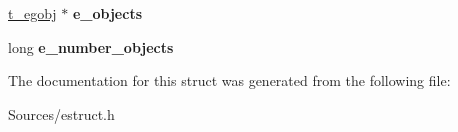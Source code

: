 \begin{DoxyCompactItemize}
\item 
\hypertarget{struct__elayer_a6f0b120b9e9be17af36ba96a368ffccb}{\hyperlink{struct__egobj}{t\-\_\-egobj} $\ast$ {\bfseries e\-\_\-objects}}\label{struct__elayer_a6f0b120b9e9be17af36ba96a368ffccb}

\item 
\hypertarget{struct__elayer_ad5b10c31f81ecf9116b72b70b25f9e79}{long {\bfseries e\-\_\-number\-\_\-objects}}\label{struct__elayer_ad5b10c31f81ecf9116b72b70b25f9e79}

\end{DoxyCompactItemize}


The documentation for this struct was generated from the following file\-:\begin{DoxyCompactItemize}
\item 
Sources/estruct.\-h\end{DoxyCompactItemize}
